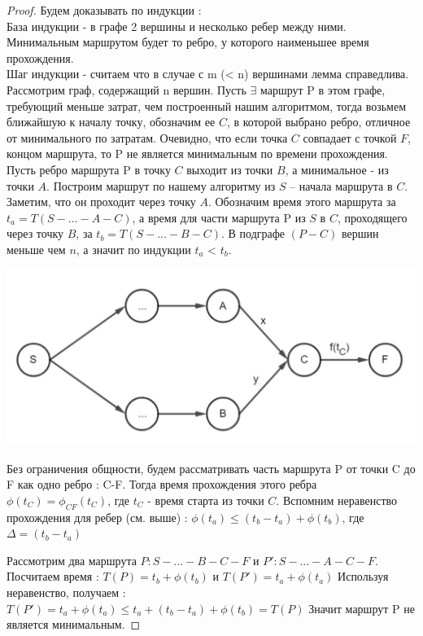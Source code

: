 \documentclass[12pt, a4paper]{article}
\begin{document}
\begin{proof}

Будем доказывать по индукции :\\
База индукции - в графе 2 вершины и несколько ребер между ними. Минимальным маршрутом будет то ребро, у которого наименьшее время прохождения.\\
Шаг индукции - считаем что в случае с m (< n) вершинами лемма справедлива. Рассмотрим граф, содержащий n вершин. Пусть $\exists$ маршрут P в этом графе, требующий меньше затрат, чем построенный нашим алгоритмом, тогда возьмем ближайшую к началу точку, обозначим ее $C$, в которой выбрано ребро, отличное от минимального по затратам. Очевидно, что если точка $C$ совпадает с точкой $F$, концом маршрута, то P не является минимальным по времени прохождения. \\
Пусть ребро маршрута P в точку $C$ выходит из точки $B$, а минимальное - из точки $A$. Построим маршрут по нашему алгоритму из $S$ -- начала маршрута в $C$. Заметим, что он проходит через точку $A$. Обозначим время этого маршрута за $t_a = T(S-...-A-C)$, а время для части маршрута P из $S$ в $C$, проходящего через точку $B$, за $t_b = T(S-...-B-C)$. В подграфе $(P-C)$ вершин меньше чем $n$, а значит по индукции $t_a$ < $t_b$. 
\begin{center}
	\includegraphics[scale=0.3]{graph_1.jpg}
\end{center}

Без ограничения общности, будем рассматривать часть маршрута P от точки C до F как одно ребро : C-F. Тогда время прохождения этого ребра $\phi(t_C) = \phi_{CF}(t_C)$, где $t_C$ - время старта из точки $C$. Вспомним неравенство прохождения для ребер (см. выше) : $\phi(t_a) \le (t_b - t_a) + \phi(t_b)$, где $\Delta = (t_b - t_a)$

Рассмотрим два маршрута $P : S-...-B-C-F$ и $P': S-...-A-C-F$.
Посчитаем время : $T(P) = t_b + \phi(t_b)$  и $T(P') = t_a + \phi(t_a)$
Используя неравенство, получаем : $T(P') = t_a + \phi(t_a) \le t_a + (t_b - t_a) + \phi(t_b) = T(P)$ Значит маршрут P не является минимальным.

\end{proof}
\end{document}
